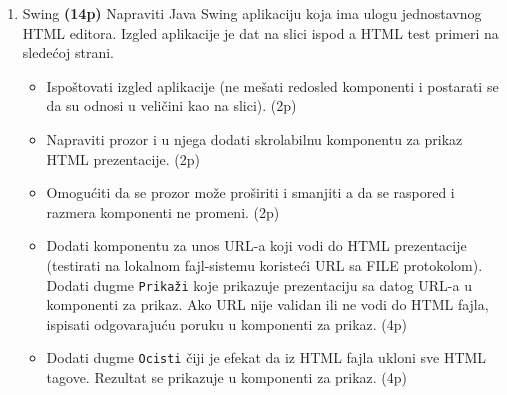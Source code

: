 \documentclass[]{article}
\begin{document}
\begin{enumerate}
  \item Swing \textbf{(14p)}
  Napraviti Java Swing aplikaciju koja ima ulogu jednostavnog HTML editora. Izgled aplikacije je dat na slici ispod a HTML test primeri na slede\'c{}oj strani.
  \begin{itemize}
    \item Ispo\v{s}tovati izgled aplikacije (ne me\v{s}ati redosled komponenti i postarati se da su odnosi u veli\v{c}ini kao na slici). \hfill (2p)
    \item Napraviti prozor i u njega dodati skrolabilnu komponentu za prikaz HTML prezentacije. \hfill (2p)
    \item Omogu\'c{}iti da se prozor mo\v{z}e pro\v{s}iriti i smanjiti a da se raspored i razmera komponenti ne promeni. \hfill (2p)
    \item Dodati komponentu za unos URL-a koji vodi do HTML prezentacije (testirati na lokalnom fajl-sistemu koriste\'c{}i URL sa FILE protokolom). Dodati dugme \texttt{Prika\v{z}i} koje prikazuje prezentaciju sa datog URL-a u komponenti za prikaz. Ako URL nije validan ili ne vodi do HTML fajla, ispisati odgovaraju\'c{}u poruku u komponenti za prikaz. \hfill (4p)
    \item Dodati dugme \texttt{Ocisti} \v{c}iji je efekat da iz HTML fajla ukloni sve HTML tagove. Rezultat se prikazuje u komponenti za prikaz. \hfill (4p)
  \end{itemize}


\end{enumerate}
\end{document}
